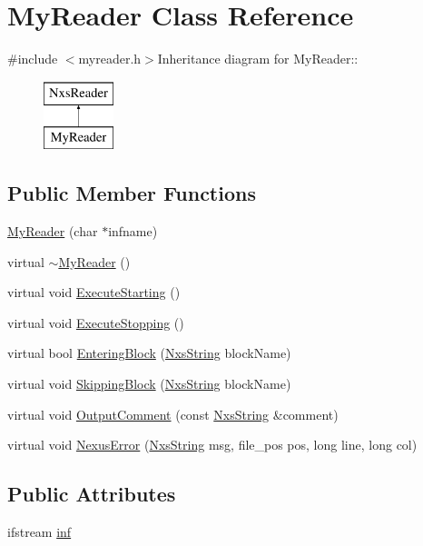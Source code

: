 \hypertarget{classMyReader}{
\section{MyReader Class Reference}
\label{classMyReader}
}


{\ttfamily \#include $<$myreader.h$>$}Inheritance diagram for MyReader::\begin{figure}[H]
\begin{center}
\leavevmode
\includegraphics[height=2cm]{classMyReader}
\end{center}
\end{figure}
\subsection*{Public Member Functions}
\begin{DoxyCompactItemize}
\item 
\hyperlink{classMyReader_a739b792f1ac98c5a80720c13f34f2e31}{MyReader} (char $\ast$infname)
\item 
virtual \hyperlink{classMyReader_a16fff4945fbe5120e2ba761dbdf157dd}{$\sim$MyReader} ()
\item 
virtual void \hyperlink{classMyReader_a93ece63ab4306cf45f030b07395bc66e}{ExecuteStarting} ()
\item 
virtual void \hyperlink{classMyReader_aba1935daa8cec049934eb84822ddda4e}{ExecuteStopping} ()
\item 
virtual bool \hyperlink{classMyReader_a9ec496b979676b633003d5d3534c026c}{EnteringBlock} (\hyperlink{classNxsString}{NxsString} blockName)
\item 
virtual void \hyperlink{classMyReader_a81320d28a7b55fd8c56a949457640b99}{SkippingBlock} (\hyperlink{classNxsString}{NxsString} blockName)
\item 
virtual void \hyperlink{classMyReader_a0860a9670236993a197ace29278b0eea}{OutputComment} (const \hyperlink{classNxsString}{NxsString} \&comment)
\item 
virtual void \hyperlink{classMyReader_ad9cf686cdeb2e191cb5179094f723ef0}{NexusError} (\hyperlink{classNxsString}{NxsString} msg, file\_\-pos pos, long line, long col)
\end{DoxyCompactItemize}
\subsection*{Public Attributes}
\begin{DoxyCompactItemize}
\item 
ifstream \hyperlink{classMyReader_a324d60c6621c75e8ae83b4edab0344f8}{inf}
\end{DoxyCompactItemize}


